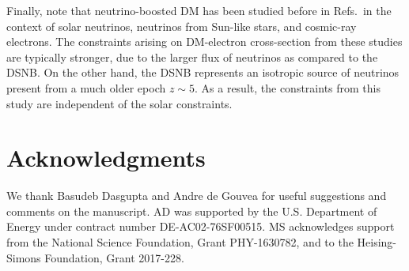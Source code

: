 \documentclass[prd,aps,twocolumn,tightenlines,notitlepage,nofootinbib,preprintnumbers,letterpaper,superscriptaddress]{revtex4-2}
\begin{document}
Finally, note that neutrino-boosted DM has been studied before in Refs.\,\cite{Zhang:2020nis, Jho:2021rmn} in the context of solar neutrinos, neutrinos from Sun-like stars, and cosmic-ray electrons. The constraints arising on DM-electron cross-section from these studies are typically stronger, due to the larger flux of neutrinos as compared to the DSNB. On the other hand, the DSNB represents an isotropic source of neutrinos present from a much older epoch $z\sim 5$. As a result, the constraints from this study are independent of the solar constraints.
\medskip
\section*{Acknowledgments}
We thank Basudeb Dasgupta and Andre de Gouvea for useful suggestions and comments on the manuscript. AD was supported by the U.S. Department of Energy under contract number DE-AC02-76SF00515. MS acknowledges support from the National Science Foundation, Grant PHY-1630782, and to the Heising-Simons Foundation, Grant 2017-228. 




\end{document}
